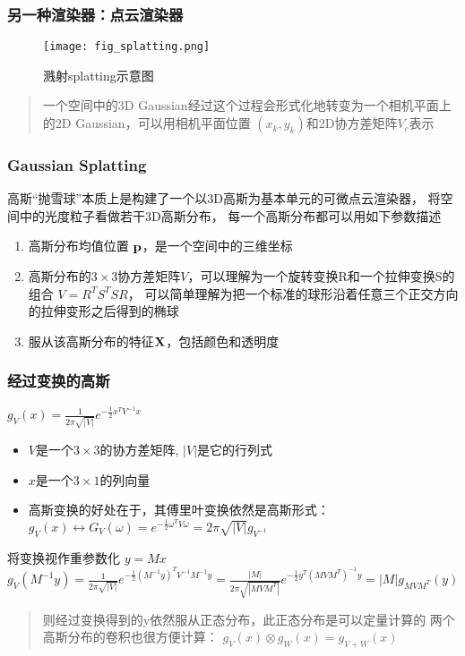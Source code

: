 \begin{frame}
    \frametitle{另一种渲染器：点云渲染器}
    \begin{figure}[H]
        \centering
        \texttt{[image: fig\_splatting.png]}
        \caption{溅射splatting示意图}
        \label{fig:tile_render}
    \end{figure}
    \begin{quote}
        一个空间中的3D Gaussian经过这个过程会形式化地转变为一个相机平面上的2D Gaussian，可以用相机平面位置 $(x_k,y_k)$和2D协方差矩阵$V_c$表示 
    \end{quote}
\end{frame}

\begin{frame}
    \frametitle{Gaussian Splatting \cite{kerbl3DGaussianSplatting2023}}
    高斯“抛雪球”本质上是构建了一个以3D高斯为基本单元的可微点云渲染器，
    将空间中的光度粒子看做若干3D高斯分布，
    每一个高斯分布都可以用如下参数描述
    \begin{enumerate}
        \item 高斯分布均值位置 $\bf{p}$，是一个空间中的三维坐标
        \item 高斯分布的$3\times 3$协方差矩阵$V$，可以理解为一个旋转变换R和一个拉伸变换S的组合 $V=R^TS^TSR$，
            可以简单理解为把一个标准的球形沿着任意三个正交方向的拉伸变形之后得到的椭球
        \item 服从该高斯分布的特征$\bf{X}$，包括颜色和透明度 
    \end{enumerate}
\end{frame}



\begin{frame}
    \frametitle{经过变换的高斯}
    $g_V(x)=\frac{1}{2\pi \sqrt{|V|}}e^{-\frac{1}{2}x^TV^{-1}x}$
    \begin{itemize}
        \item $V$是一个$3\times 3$的协方差矩阵, $|V|$是它的行列式
        \item $x$是一个$3\times 1$的列向量
        \item 高斯变换的好处在于，其傅里叶变换依然是高斯形式：$g_V(x)\leftrightarrow G_V(\omega)=e^{-\frac{1}{2}\omega^TV\omega}=2\pi \sqrt{|V|}g_{V^{-1}}$
    \end{itemize}
    将变换视作重参数化 $y = Mx$
    $g_V(M^{-1}y)=\frac{1}{2\pi\sqrt{|V|}}e^{-\frac{1}{2}(M^{-1}y)^TV^{-1}M^{-1}y}=\frac{|M|}{2\pi\sqrt{|MVM^T|}}e^{-\frac{1}{2}y^T(MVM^T)^{-1}y}=|M|g_{MVM^T}(y)$
    \begin{quote}
    则经过变换得到的y依然服从正态分布，此正态分布是可以定量计算的
    两个高斯分布的卷积也很方便计算： $g_V(x)\otimes g_W(x)=g_{V+W}(x)$
    \end{quote}
\end{frame}

